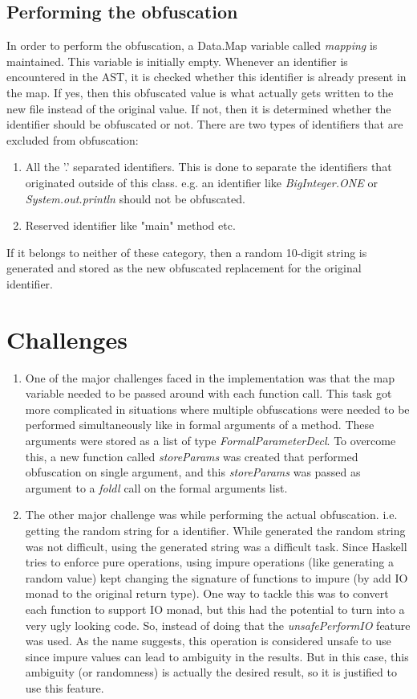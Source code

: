 \documentclass{article}
\begin{document}
\subsection{Performing the obfuscation}
In order to perform the obfuscation, a Data.Map variable called \textit{mapping} is maintained. This variable is initially empty. Whenever an identifier
is encountered in the AST, it is checked whether this identifier is already present in the map. If yes, then this obfuscated value is what actually gets
written to the new file instead of the original value. If not, then it is determined whether the identifier should be obfuscated or not. There are two types of identifiers that are excluded from obfuscation:
\begin{enumerate}
\item All the '.' separated identifiers. This is done to separate the identifiers that originated outside of this class. e.g. an identifier like \textit{BigInteger.ONE} or \textit{System.out.println} should not be obfuscated.
\item Reserved identifier like "main" method etc.
\end{enumerate}
If it belongs to neither of these category, then a random 10-digit string is generated and stored as the new obfuscated replacement for the original identifier.


\section{Challenges}
\begin{enumerate}
\item One of the major challenges faced in the implementation was that the map variable needed to be passed around with each function call. This task got more complicated in situations where multiple obfuscations were needed to be performed simultaneously like in formal arguments of a method. These arguments were stored as a list of type \textit{FormalParameterDecl}. To overcome this, a new function called \textit{storeParams} was created that performed obfuscation on single argument, and this \textit{storeParams} was passed as argument to a \textit{foldl} call on the formal arguments list. 

\item The other major challenge was while performing the actual obfuscation. i.e. getting the random string for a identifier. While generated the random string was not difficult, using the generated string was a difficult task. Since Haskell tries to enforce pure operations, using impure operations (like generating a random value) kept changing the signature of functions to impure (by add IO monad to the original return type). One way to tackle this was to convert each function to support IO monad, but this had the potential to turn into a very ugly looking code. So, instead of doing that the \textit{unsafePerformIO} feature was used. As the name suggests, this operation is considered unsafe to use since impure values can lead to ambiguity in the results. But in this case, this ambiguity (or randomness) is actually the desired result, so it is justified to use this feature.
\end{enumerate}
\end{document}
